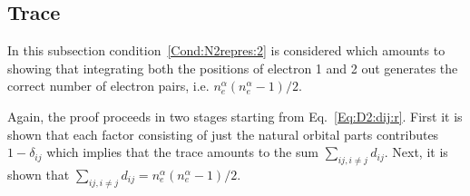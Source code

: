 \documentclass[pra,nofootinbib]{revtex4-1}
\newcommand{\dlabel}[1]{\text{#1}\label{#1}}
\begin{document}
\subsection{Trace}
\dlabel{Sect:Trace}

In this subsection condition~\ref{Cond:N2repres:2} is considered which amounts
to showing that integrating both the positions of electron 1 and 2 out generates
the correct number of electron pairs, i.e. $n_e^\alpha(n_e^\alpha-1)/2$.

Again, the proof proceeds in two stages starting from Eq.~\ref{Eq:D2:dij:r}.
First it is shown that each factor consisting of just the natural orbital
parts contributes $1-\delta_{ij}$ which implies that the trace amounts to the
sum $\sum_{ij,i \ne j}d_{ij}$. Next, it is shown that 
$\sum_{ij,i \ne j}d_{ij}=n_e^\alpha(n_e^\alpha-1)/2$.
\end{document}
